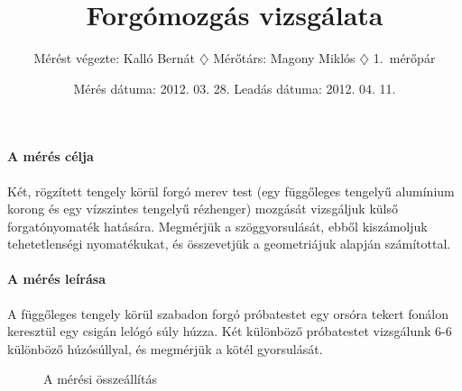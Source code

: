 \documentclass[12pt]{article}
\title{Forgómozgás vizsgálata}
\author{Mérést végezte: Kalló Bernát $\diamondsuit$ Mérőtárs: Magony Miklós $\diamondsuit$ 1.\ mérőpár}
\date{Mérés dátuma: 2012. 03. 28. Leadás dátuma: 2012. 04. 11.}
\begin{document}
\maketitle

\def\Ms{\ensuremath{M_s}}\def\rho{\ensuremath{\varrho}}\def\Thetamert{\ensuremath{\Theta_{\text{mért}}}}\def\Thetaszam{\ensuremath{\Theta_{\text{szám}}}}\def\DeltaThetamert{\ensuremath{\Delta\ensuremath{\Theta_{\text{mért}}}}}\def\DeltaThetaszam{\ensuremath{\Delta\ensuremath{\Theta_{\text{szám}}}}}\def\deltaThetamert{\ensuremath{\delta\ensuremath{\Theta_{\text{mért}}}}}\def\deltaThetaszam{\ensuremath{\delta\ensuremath{\Theta_{\text{szám}}}}}\def\korong{\text{korong}}\def\rud{\text{rúd}}\def\fonal{\text{fonaltárcsa}}\def\Thetarud{\ensuremath{\ensuremath{\Theta} _{\text{rúd}}}}\def\Thetakorong{\ensuremath{\ensuremath{\Theta}_{\text{korong}}}}\def\mfonal{\ensuremath{m_{\text{fonaltárcsa}}}}


\paragraph*{A mérés célja}
Két, rögzített tengely körül forgó merev test (egy függőleges tengelyű alumínium korong és egy vízszintes tengelyű rézhenger) mozgását vizsgáljuk külső forgatónyomaték hatására. Megmérjük a szöggyorsulását, ebből kiszámoljuk tehetetlenségi nyomatékukat, és összevetjük a geometriájuk alapján számítottal.

\paragraph*{A mérés leírása}
A függőleges tengely körül szabadon forgó próbatestet egy orsóra tekert fonálon keresztül egy csigán lelógó súly húzza.
Két különböző próbatestet vizsgálunk 6-6 különböző húzósúllyal, és megmérjük a kötél gyorsulását.

\begin{figure}[H]
\begin{center}
\end{center}
\caption{A mérési összeállítás}
\end{figure}
\end{document}
